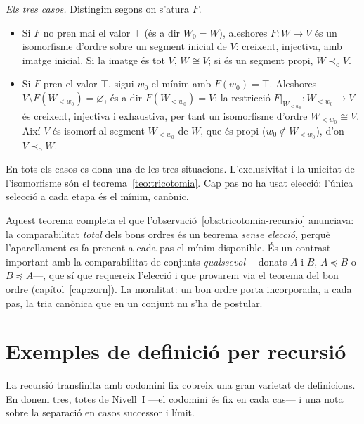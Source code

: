 \begin{prova}
\emph{Els tres casos.} Distingim segons on s'atura \(F\).
\begin{itemize}
\item Si \(F\) no pren mai el valor \(\top\) (és a dir \(W_0=W\)), aleshores
\(F\colon W\to V\) és un isomorfisme d'ordre sobre un segment inicial de
\(V\): creixent, injectiva, amb imatge inicial. Si la imatge és tot \(V\),
\(W\cong V\); si és un segment propi, \(W\prec_{\mathrm o}V\).
\item Si \(F\) pren el valor \(\top\), sigui \(w_0\) el mínim amb
\(F(w_0)=\top\). Aleshores \(V\setminus F(W_{<w_0})=\varnothing\), és a dir
\(F(W_{<w_0})=V\): la restricció \(F|_{W_{<w_0}}\colon W_{<w_0}\to V\) és
creixent, injectiva i exhaustiva, per tant un isomorfisme d'ordre
\(W_{<w_0}\cong V\). Així \(V\) és isomorf al segment \(W_{<w_0}\) de \(W\), que és propi
(\(w_0\notin W_{<w_0}\)), d'on \(V\prec_{\mathrm o}W\).
\end{itemize}
En tots els casos es dona una de les tres situacions. L'exclusivitat i la
unicitat de l'isomorfisme són el teorema~\ref{teo:tricotomia}. Cap pas no ha
usat elecció: l'única selecció a cada etapa és el mínim, canònic.
\end{prova}

\begin{observacio}\label{obs:comparabilitat-vs-eleccio}
Aquest teorema completa el que l'observació~\ref{obs:tricotomia-recursio}
anunciava: la comparabilitat \emph{total} dels bons ordres és un teorema
\emph{sense elecció}, perquè l'aparellament es fa prenent a cada pas el mínim
disponible. És un contrast important amb la comparabilitat de conjunts
\emph{qualssevol} ---donats \(A\) i \(B\), \(A\preceq B\) o \(B\preceq A\)---,
que sí que requereix l'elecció i que provarem via el teorema del bon ordre (capítol~\ref{cap:zorn}). La moralitat: un bon ordre porta incorporada, a
cada pas, la tria canònica que en un conjunt nu s'ha de postular.
\end{observacio}

\section{Exemples de definició per recursió}\label{sec:exemples-recursio}

La recursió transfinita amb codomini fix cobreix una gran varietat de
definicions. En donem tres, totes de Nivell~I ---el codomini és fix en cada
cas--- i una nota sobre la separació en casos successor i límit.

